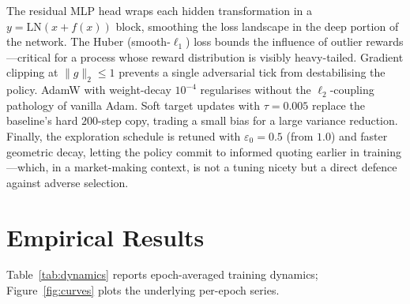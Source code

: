 \documentclass[12pt]{article}
\begin{document}
The residual MLP head wraps each hidden transformation in a $y = \mathrm{LN}(x + f(x))$ block, smoothing the loss landscape in the deep portion of the network. The Huber (smooth-$\ell_1$) loss bounds the influence of outlier rewards---critical for a process whose reward distribution is visibly heavy-tailed. Gradient clipping at $\|g\|_2 \le 1$ prevents a single adversarial tick from destabilising the policy. AdamW with weight-decay $10^{-4}$ regularises without the $\ell_2$-coupling pathology of vanilla Adam. Soft target updates with $\tau = 0.005$ replace the baseline's hard $200$-step copy, trading a small bias for a large variance reduction. Finally, the exploration schedule is retuned with $\varepsilon_0 = 0.5$ (from $1.0$) and faster geometric decay, letting the policy commit to informed quoting earlier in training---which, in a market-making context, is not a tuning nicety but a direct defence against adverse selection.

\section{Empirical Results}

Table~\ref{tab:dynamics} reports epoch-averaged training dynamics; Figure~\ref{fig:curves} plots the underlying per-epoch series.
\end{document}
